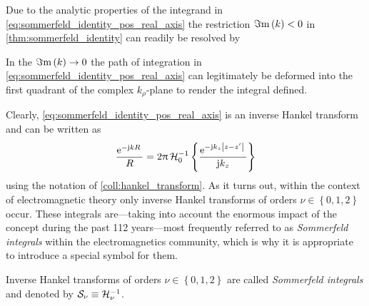 Due to the analytic properties of the integrand in
\eqref{eq:sommerfeld_identity_pos_real_axis} the restriction $\Im\mathrm{m}\left(k\right) < 0$
in \cref{thm:sommerfeld_identity} can readily be resolved by
\begin{corollary}
	In the $\Im\mathrm{m}\left(k\right) \to 0$ the path of integration in
	\eqref{eq:sommerfeld_identity_pos_real_axis} can legitimately be deformed
	into the first quadrant of the complex $k_\rho$-plane to render the integral
	defined.
\end{corollary}

Clearly, \eqref{eq:sommerfeld_identity_pos_real_axis} is an inverse Hankel
transform and can be written as
\begin{equation}
		\frac{\mathrm{e}^{-\mathrm{j} k R}\,}{R} = 
		2\uppi \,
		\mathcal{H}^{-1}_{0}
		\left\{ \frac{\mathrm{e}^{-\mathrm{j} k_z \left\vert z - z^\prime\right\vert}\,}{\mathrm{j} k_z} \right\} 
\end{equation}
using the notation of \cref{coll:hankel_transform}.
As it turns out, within the context of electromagnetic theory only
inverse Hankel transforms of orders $\nu \in \left\{0, 1, 2\right\}$
occur.
These integrals are---taking into account the enormous impact of the
concept during the past 112 years---most frequently referred to as
\emph{Sommerfeld integrals} within the electromagnetics community, which is why
it is appropriate to introduce a special symbol for them.
\begin{definition}	
	Inverse Hankel transforms of orders $\nu \in \left\{0, 1, 2\right\}$
	are called \emph{Sommerfeld integrals} and denoted by
	$\mathcal{S}_{\nu} \equiv \mathcal{H}^{-1}_{\nu}$.
\end{definition}

